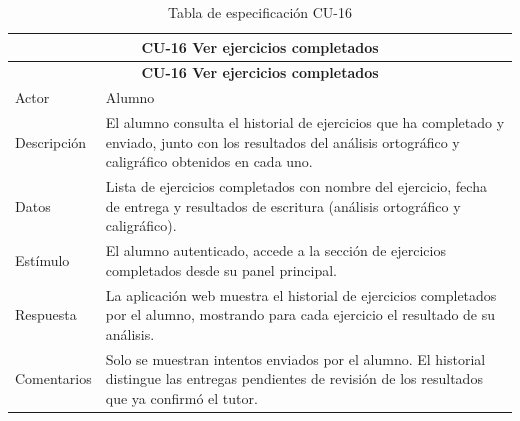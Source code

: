 \begin{longtable}{|p{4cm}|p{11cm}|}
\caption{Tabla de especificación CU-16}
\label{tab:cu16} \\

\hline
\multicolumn{2}{|c|}{\textbf{CU-16 Ver ejercicios completados}} \\
\hline
\endfirsthead

\hline
\multicolumn{2}{|c|}{\textbf{CU-16 Ver ejercicios completados}} \\
\hline
\endhead

\hline
\endfoot
\endlastfoot

Actor & Alumno \\
\hline

Descripción & El alumno consulta el historial de ejercicios que ha completado y enviado, junto con los resultados del análisis ortográfico y caligráfico obtenidos en cada uno. \\
\hline

Datos & Lista de ejercicios completados con nombre del ejercicio, fecha de entrega y resultados de escritura (análisis ortográfico y caligráfico). \\
\hline

Estímulo & El alumno autenticado, accede a la sección de ejercicios completados desde su panel principal. \\
\hline

Respuesta & La aplicación web muestra el historial de ejercicios completados por el alumno, mostrando para cada ejercicio el resultado de su análisis. \\
\hline

Comentarios & Solo se muestran intentos enviados por el alumno. El historial distingue las entregas pendientes de revisión de los resultados que ya confirmó el tutor. \\
\hline

\end{longtable}

